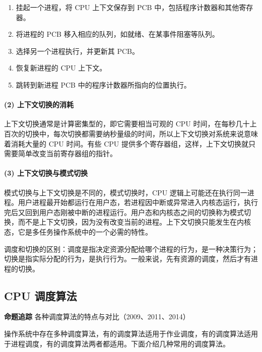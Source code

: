 \documentclass{ctexbook}
\begin{document}
	\begin{enumerate}
		\item 挂起一个进程，将 CPU 上下文保存到 PCB 中，包括程序计数器和其他寄存器。
		\item 将进程的 PCB 移入相应的队列，如就绪、在某事件阻塞等队列。
		\item 选择另一个进程执行，并更新其 PCB。
		\item 恢复新进程的 CPU 上下文。
		\item 跳转到新进程 PCB 中的程序计数器所指向的位置执行。
	\end{enumerate}
	
	\paragraph{(2) 上下文切换的消耗}
	
	上下文切换通常是计算密集型的，即它需要相当可观的 CPU 时间，在每秒几十上百次的切换中，每次切换都需要纳秒量级的时间，所以上下文切换对系统来说意味着消耗大量的 CPU 时间。有些 CPU 提供多个寄存器组，这样，上下文切换就只需要简单改变当前寄存器组的指针。
	
	\paragraph{(3) 上下文切换与模式切换}
	
	模式切换与上下文切换是不同的，模式切换时，CPU 逻辑上可能还在执行同一进程。用户进程最开始都运行在用户态，若进程因中断或异常进入内核态运行，执行完后又回到用户态刚被中断的进程运行。用户态和内核态之间的切换称为模式切换，而不是上下文切换，因为没有改变当前的进程。上下文切换只能发生在内核态，它是多任务操作系统中的一个必需的特性。
	
	\begin{tcolorbox}[colback=gray!10, colframe=black!50, title=注意]
		调度和切换的区别：调度是指决定资源分配给哪个进程的行为，是一种决策行为；切换是指实际分配的行为，是执行行为。一般来说，先有资源的调度，然后才有进程的切换。
	\end{tcolorbox}
	
	\subsection{CPU 调度算法}
	
	\textbf{命题追踪} 各种调度算法的特点与对比（2009、2011、2014）
	
	操作系统中存在多种调度算法，有的调度算法适用于作业调度，有的调度算法适用于进程调度，有的调度算法两者都适用。下面介绍几种常用的调度算法。
	
\end{document}
